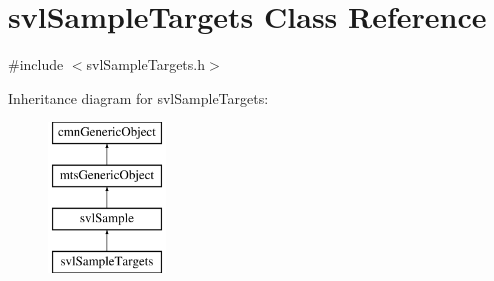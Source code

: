 \hypertarget{classsvl_sample_targets}{}\section{svl\+Sample\+Targets Class Reference}
\label{classsvl_sample_targets}


{\ttfamily \#include $<$svl\+Sample\+Targets.\+h$>$}

Inheritance diagram for svl\+Sample\+Targets\+:\begin{figure}[H]
\begin{center}
\leavevmode
\includegraphics[height=4.000000cm]{dc/dc4/classsvl_sample_targets}
\end{center}
\end{figure}
